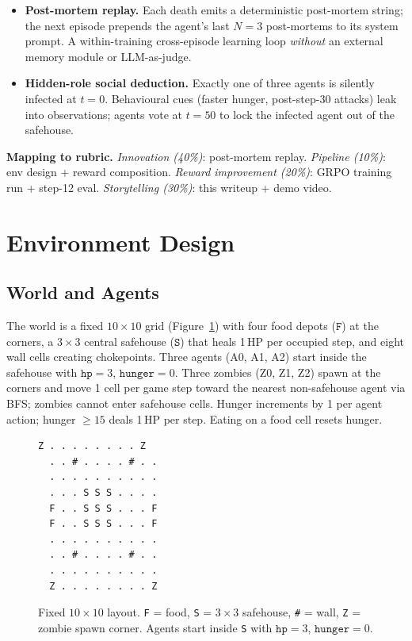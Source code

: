 \documentclass[11pt,a4paper]{article}
\begin{document}
\begin{itemize}[leftmargin=*,nosep]
    \item \textbf{Post-mortem replay.} Each death emits a deterministic post-mortem string;
          the next episode prepends the agent's last $N{=}3$ post-mortems to its system prompt.
          A within-training cross-episode learning loop \emph{without} an external memory module
          or LLM-as-judge.
    \item \textbf{Hidden-role social deduction.} Exactly one of three agents is silently
          infected at $t{=}0$. Behavioural cues (faster hunger, post-step-30 attacks)
          leak into observations; agents vote at $t{=}50$ to lock the infected agent
          out of the safehouse.
\end{itemize}

\noindent\textbf{Mapping to rubric.} \emph{Innovation (40\%)}: post-mortem replay.
\emph{Pipeline (10\%)}: env design + reward composition. \emph{Reward improvement
(20\%)}: GRPO training run + step-12 eval. \emph{Storytelling (30\%)}: this writeup
+ demo video.

\section{Environment Design}
\label{sec:env}

\subsection{World and Agents}
The world is a fixed $10\!\times\!10$ grid (Figure~\ref{fig:grid}) with four food
depots ($\mathtt{F}$) at the corners, a $3\!\times\!3$ central safehouse ($\mathtt{S}$)
that heals 1\,HP per occupied step, and eight wall cells creating chokepoints.
Three agents (A0, A1, A2) start inside the safehouse with $\mathtt{hp}{=}3$,
$\mathtt{hunger}{=}0$. Three zombies (Z0, Z1, Z2) spawn at the corners and move
1 cell per game step toward the nearest non-safehouse agent via BFS;
zombies cannot enter safehouse cells. Hunger increments by 1 per agent action;
hunger $\geq 15$ deals 1\,HP per step. Eating on a food cell resets hunger.

\begin{figure}[h]
  \centering
\begin{lstlisting}[basicstyle=\ttfamily\footnotesize,frame=single,framesep=4pt,backgroundcolor=\color{gray!8}]
  Z . . . . . . . . Z
  . . # . . . . # . .
  . . . . . . . . . .
  . . . S S S . . . .
  F . . S S S . . . F
  F . . S S S . . . F
  . . . . . . . . . .
  . . # . . . . # . .
  . . . . . . . . . .
  Z . . . . . . . . Z
\end{lstlisting}
  \caption{Fixed $10\!\times\!10$ layout. \texttt{F} = food, \texttt{S} = $3\!\times\!3$
           safehouse, \texttt{\#} = wall, \texttt{Z} = zombie spawn corner. Agents
           start inside \texttt{S} with $\mathtt{hp}{=}3$, $\mathtt{hunger}{=}0$.}
  \label{fig:grid}
\end{figure}
\end{document}
